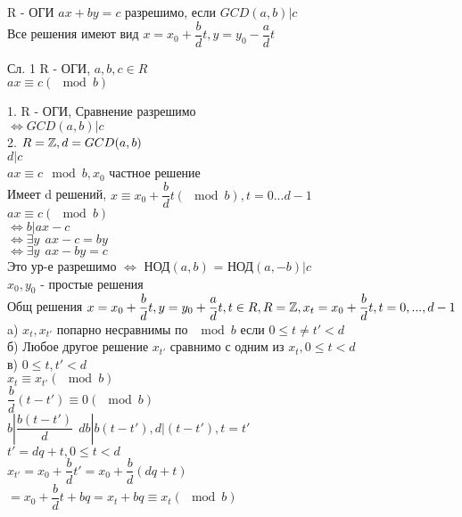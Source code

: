 
\begin{theorem}
	 R - ОГИ $ ax+by=c $ разрешимо, если $  GCD(a, b) | c $ \\
	Все решения имеют вид $ x = x_0 + \dfrac{b}{d} t, y = y_0 - \dfrac{a}{d}t $ \\
\end{theorem}
Сл. 1 R - ОГИ, $a, b, c \in  R $ \\
$ ax \equiv c (\mod b) $ \\
\begin{theorem}
	1. R - ОГИ, Сравнение разрешимо \\
	$ \Leftrightarrow GCD(a, b) | c $ \\
	2. $ R = \mathbb{Z}, d = GCD(a, b) $ \\
	$ d | c $  \\
	$ ax \equiv c \mod b, x_0 $ частное решение \\
	Имеет d решений, $ x \equiv x_0 + \dfrac{b}{d}t (\mod b), t = 0...d-1$\\
	$ ax \equiv c (\mod b) $ \\
	$ \Leftrightarrow b | ax - c $ \\
	$ \Leftrightarrow \exists y \ \ ax - c = by $ \\
	$ \Leftrightarrow \exists y \ \ ax - by = c $ \\
	Это ур-е разрешимо $ \Leftrightarrow $ НОД$(a,b)$ = НОД$(a, -b)  | c$ \\
	$ x_0, y_0 $ - простые решения \\
	Общ решения $ x = x_0 + \dfrac{b}{d}t , y = y_0 + \dfrac{a}{d}t, t \in R, R = \mathbb{Z}, x_t = x_0 + \dfrac{b}{d} t, t = 0, ... ,d-1 $ \\
	a) $ x_t, x_{t'} $ попарно несравнимы по  $ \mod b $ если $ 0 \leq t \neq t' < d $ \\
	б) Любое другое решение $ x_{t'} $ сравнимо с одним из $ x_t, 0 \leq t < d $ \\
	в) $ 0 \leq t, t' < d $ \\
	$ x_t \equiv x_{t'} (\mod b) $ \\
	$ \dfrac{b}{d} (t - t') \equiv 0 (\mod b) $ \\
	$ b | \dfrac{b(t - t')}{d}  \ \ db | b(t-t'), d | (t - t'), t = t' $ \\
	
	$ t' = dq + t, 0 \leq t < d $ \\
	$ x_{t'} = x_0 + \dfrac{b}{d} t' = x_0 + \dfrac{b}{d} (dq+t) $ \\
	$ = x_0 + \dfrac{b}{d} t + bq = x_t + bq \equiv x_t (\mod b) $ \\
 \end{theorem}


